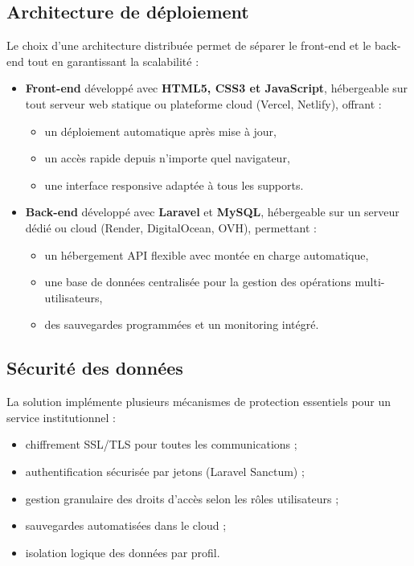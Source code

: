 \subsection*{Architecture de déploiement}

Le choix d'une architecture distribuée permet de séparer le front-end
et le back-end tout en garantissant la scalabilité :

\begin{itemize}
    \item \textbf{Front-end} développé avec \textbf{HTML5, CSS3 et
    JavaScript}, hébergeable sur tout serveur web statique ou
    plateforme cloud (Vercel, Netlify), offrant :
    \begin{itemize}
        \item un déploiement automatique après mise à jour,
        \item un accès rapide depuis n'importe quel navigateur,
        \item une interface responsive adaptée à tous les supports.
    \end{itemize}

    \item \textbf{Back-end} développé avec \textbf{Laravel} et
    \textbf{MySQL}, hébergeable sur un serveur dédié ou cloud
    (Render, DigitalOcean, OVH), permettant :
    \begin{itemize}
        \item un hébergement API flexible avec montée en charge
        automatique,
        \item une base de données centralisée pour la gestion
        des opérations multi-utilisateurs,
        \item des sauvegardes programmées et un monitoring intégré.
    \end{itemize}
\end{itemize}

\subsection*{Sécurité des données}

La solution implémente plusieurs mécanismes de protection essentiels
pour un service institutionnel :

\begin{itemize}
    \item chiffrement SSL/TLS pour toutes les communications ;
    \item authentification sécurisée par jetons (Laravel Sanctum) ;
    \item gestion granulaire des droits d'accès selon les rôles
    utilisateurs ;
    \item sauvegardes automatisées dans le cloud ;
    \item isolation logique des données par profil.
\end{itemize}

